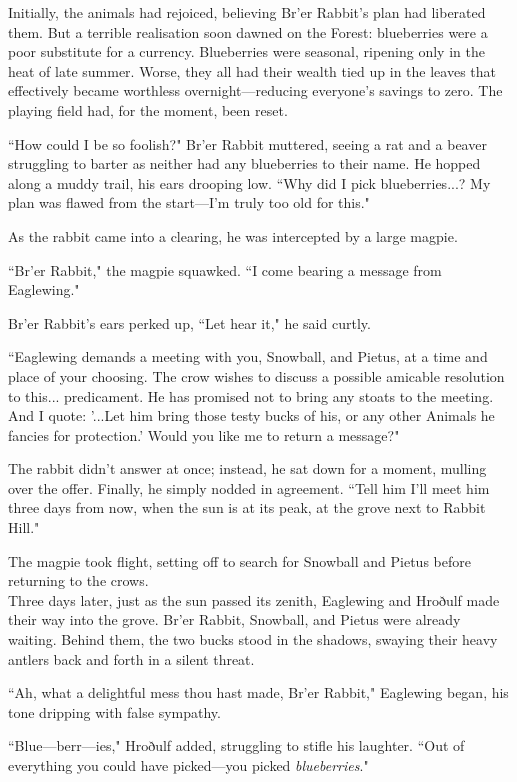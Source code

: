 Initially, the animals had rejoiced, believing Br'er Rabbit's plan had liberated them.
But a terrible realisation soon dawned on the Forest: blueberries were a poor substitute for a currency.
Blueberries were seasonal, ripening only in the heat of late summer.
Worse, they all had their wealth tied up in the leaves that effectively became worthless overnight---reducing everyone's savings to zero.
The playing field had, for the moment, been reset.

``How could I be so foolish?" Br'er Rabbit muttered, seeing a rat and a beaver struggling to barter as neither had any blueberries to their name.
He hopped along a muddy trail, his ears drooping low.
``Why did I pick blueberries...? My plan was flawed from the start---I'm truly too old for this."

As the rabbit came into a clearing, he was intercepted by a large magpie.

``Br'er Rabbit," the magpie squawked.
``I come bearing a message from Eaglewing."

Br'er Rabbit's ears perked up, ``Let hear it," he said curtly.

``Eaglewing demands a meeting with you, Snowball, and Pietus, at a time and place of your choosing.
The crow wishes to discuss a possible amicable resolution to this... predicament.
He has promised not to bring any stoats to the meeting.
And I quote: '...Let him bring those testy bucks of his, or any other Animals he fancies for protection.'
Would you like me to return a message?"

The rabbit didn't answer at once; instead, he sat down for a moment, mulling over the offer.
Finally, he simply nodded in agreement.
``Tell him I'll meet him three days from now, when the sun is at its peak, at the grove next to Rabbit Hill."

The magpie took flight, setting off to search for Snowball and Pietus before returning to the crows.\\

Three days later, just as the sun passed its zenith, Eaglewing and Hroðulf made their way into the grove.
Br'er Rabbit, Snowball, and Pietus were already waiting.
Behind them, the two bucks stood in the shadows, swaying their heavy antlers back and forth in a silent threat.

``Ah, what a delightful mess thou hast made, Br'er Rabbit," Eaglewing began, his tone dripping with false sympathy.

``Blue---berr---ies," Hroðulf added, struggling to stifle his laughter.
``Out of everything you could have picked---you picked \textit{blueberries}."


